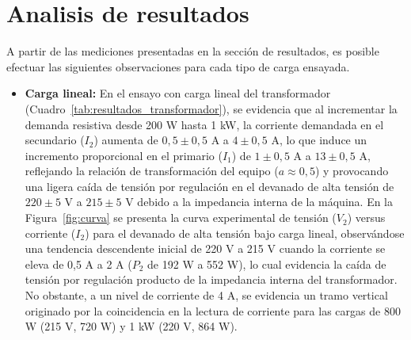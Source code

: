 \section{Analisis de resultados}

A partir de las mediciones presentadas en la sección de resultados, es posible efectuar las siguientes observaciones para cada tipo de carga ensayada.

\begin{itemize}
    \item \textbf{Carga lineal:} En el ensayo con carga lineal del transformador (Cuadro~\ref{tab:resultados_transformador}), se evidencia que al incrementar la demanda resistiva desde 200 W hasta 1 kW, la corriente demandada en el secundario ($I_2$) aumenta de $0,5 \pm 0,5\text{ A}$ a $4 \pm 0,5\text{ A}$, lo que induce un incremento proporcional en el primario ($I_1$) de $1 \pm 0,5\text{ A}$ a $13 \pm 0,5\text{ A}$, reflejando la relación de transformación del equipo ($a \approx 0,5$) y provocando una ligera caída de tensión por regulación en el devanado de alta tensión de $220 \pm 5\text{ V}$ a $215 \pm 5\text{ V}$ debido a la impedancia interna de la máquina. En la Figura~\ref{fig:curva} se presenta la curva experimental de tensión ($V_2$) versus corriente ($I_2$) para el devanado de alta tensión bajo carga lineal, observándose una tendencia descendente inicial de 220 V a 215 V cuando la corriente se eleva de 0,5 A a 2 A ($P_2$ de 192 W a 552 W), lo cual evidencia la caída de tensión por regulación producto de la impedancia interna del transformador. No obstante, a un nivel de corriente de 4 A, se evidencia un tramo vertical originado por la coincidencia en la lectura de corriente para las cargas de 800 W (215 V, 720 W) y 1 kW (220 V, 864 W).


\end{itemize}
